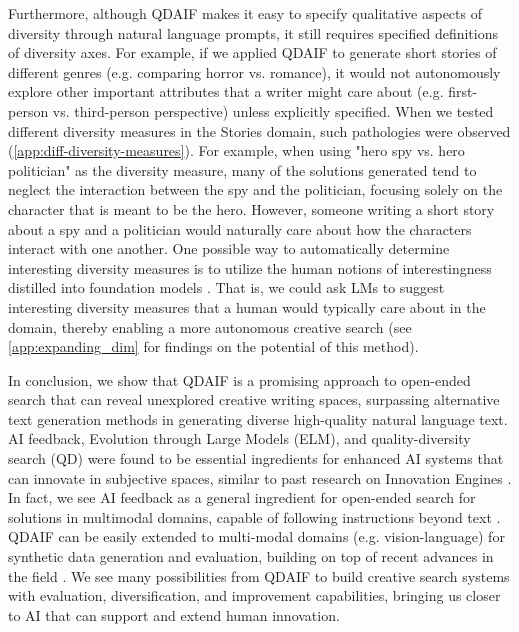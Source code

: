 Furthermore, although QDAIF makes it easy to specify qualitative aspects of diversity through natural language prompts, it still requires specified definitions of diversity axes. For example, if we applied QDAIF to generate short stories of different genres (e.g. comparing horror vs. romance), it would not autonomously explore other important attributes that a writer might care about (e.g. first-person vs. third-person perspective) unless explicitly specified. When we tested different diversity measures in the Stories domain, such pathologies were observed (\cref{app:diff-diversity-measures}). For example, when using "hero spy vs. hero politician" as the diversity measure, many of the solutions generated tend to neglect the interaction between the spy and the politician, focusing solely on the character that is meant to be the hero. However, someone writing a short story about a spy and a politician would naturally care about how the characters interact with one another. One possible way to automatically determine interesting diversity measures is to utilize the human notions of interestingness distilled into foundation models \citep{zhang2023omni}. That is, we could ask LMs to suggest interesting diversity measures that a human would typically care about in the domain, thereby enabling a more autonomous creative search (see \cref{app:expanding_dim} for findings on the potential of this method).

In conclusion, we show that QDAIF is a promising approach to open-ended search that can reveal unexplored creative writing spaces, surpassing alternative text generation methods in generating diverse high-quality natural language text. AI feedback, Evolution through Large Models (ELM), and quality-diversity search (QD) were found to be essential ingredients for enhanced AI systems that can innovate in subjective spaces, similar to past research on Innovation Engines \citep{nguyen2016understanding, nguyen2015innovation}. In fact, we see AI feedback as a general ingredient for open-ended search for solutions in multimodal domains, capable of following instructions beyond text \citep{liu2023visual}. QDAIF can be easily extended to multi-modal domains (e.g. vision-language) for synthetic data generation and evaluation, building on top of recent advances in the field \citep{eichenberg2021magma,alayrac2022flamingo,bellagente2023multifusion,driess2023palm,bhatt2023surrogate,sudhakaran2023mariogpt,todd2023level}. We see many possibilities from QDAIF to build creative search systems with evaluation, diversification, and improvement capabilities, bringing us closer to AI that can support and extend human innovation.

